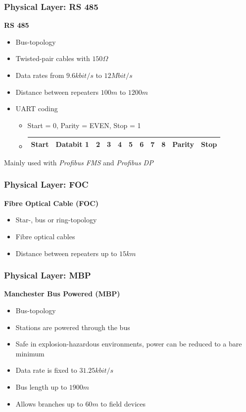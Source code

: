 \documentclass{beamer}
\begin{document}
\begin{frame}
  \frametitle{Physical Layer: RS 485}
  \textbf{RS 485}
  \begin{itemize}
    \item Bus-topology
    \item Twisted-pair cables with $150\Omega$
    \item Data rates from $9.6kbit/s$ to $12Mbit/s$
    \item Distance between repeaters $100m$ to $1200m$
    \item UART coding \\
      \footnotesize
      \begin{itemize}
        \item Start = 0, Parity = EVEN, Stop = 1 \\
        \item
          \begin{tabular}[h]{|c|c|c|c|c|c|c|c|c|c|c|}
            \hline
            Start & Databit 1 & 2 & 3 & 4 & 5 & 6 & 7 & 8 & Parity & Stop \\
            \hline
          \end{tabular}
      \end{itemize}
  \end{itemize}
  Mainly used with \textit{Profibus FMS} and \textit{Profibus DP}
\end{frame}

\begin{frame}
  \frametitle{Physical Layer: FOC}
  \textbf{Fibre Optical Cable (FOC)}
  \begin{itemize}
    \item Star-, bus or ring-topology
    \item Fibre optical cables
    \item Distance between repeaters up to $15km$
  \end{itemize}
\end{frame}

\begin{frame}
  \frametitle{Physical Layer: MBP}
  \textbf{Manchester Bus Powered (MBP)}
  \begin{itemize}
    \item Bus-topology
    \item Stations are powered through the bus
    \item Safe in explosion-hazardous environments, power can be reduced to a bare minimum
    \item Data rate is fixed to $31.25kbit/s$
    \item Bus length up to $1900m$
    \item Allows branches up to $60m$ to field devices
  \end{itemize}
\end{frame}
\end{document}
